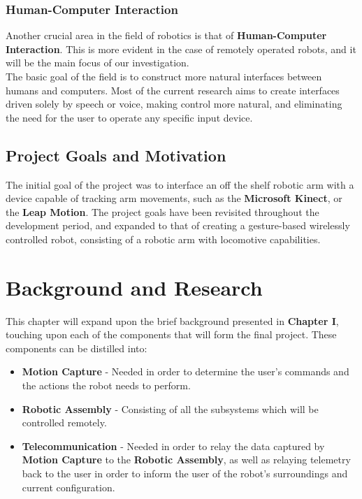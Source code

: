 \documentclass[12p,a4paper]{report}
\begin{document}
\subsection{Human-Computer Interaction}
Another crucial area in the field of robotics is that of \textbf{Human-Computer Interaction}. This is more evident in the case of remotely operated robots, and it will be the main focus of our investigation. \\

The basic goal of the field is to construct more natural interfaces between humans and computers. Most of the current research aims to create interfaces driven solely by speech or voice, making control more natural, and eliminating the need for the user to operate any specific input device.

\section{Project Goals and Motivation}
The initial goal of the project was to interface an off the shelf robotic arm with a device capable of tracking arm movements, such as the \textbf{Microsoft Kinect}, or the \textbf{Leap Motion}. The project goals have been revisited throughout the development period, and expanded to that of creating a gesture-based wirelessly controlled robot, consisting of a robotic arm with locomotive capabilities.

\chapter{Background and Research}
This chapter will expand upon the brief background presented in \textbf{Chapter I}, touching upon each of the components that will form the final project. These components can be distilled into:
\begin{itemize}
\item \textbf{Motion Capture} - Needed in order to determine the user's commands and the actions the robot needs to perform.
\item \textbf{Robotic Assembly} - Consisting of all the subsystems which will be controlled remotely.
\item \textbf{Telecommunication} - Needed in order to relay the data captured by \textbf{Motion Capture} to the \textbf{Robotic Assembly}, as well as relaying telemetry back to the user in order to inform the user of the robot's surroundings and current configuration.  
\end{itemize}
\end{document}
